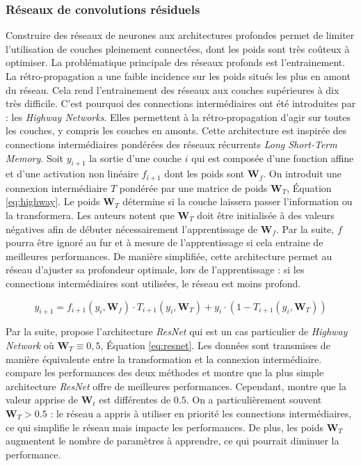 \subsubsection{Réseaux de convolutions résiduels} \label{subsubsec:ResNet}
Construire des réseaux de neurones aux architectures profondes permet de limiter l'utilisation de couches pleinement connectées, dont les poids sont très coûteux à optimiser.
La problématique principale des réseaux profonds est l'entrainement.
La rétro-propagation a une faible incidence sur les poids situés les plus en amont du réseau.
Cela rend l'entrainement des réseaux aux couches supérieures à dix très difficile.
C'est pourquoi des connections intermédiaires ont été introduites par \cite{srivastava_highway_2015, srivastava_training_2015} : les \textit{Highway Networks}.
Elles permettent à la rétro-propagation d'agir sur toutes les couches, y compris les couches en amonts.
Cette architecture est inspirée des connections intermédiaires pondérées des réseaux récurrents \textit{Long Short-Term Memory}.
Soit $y_{i+1}$ la sortie d'une couche $i$ qui est composée d'une fonction affine et d'une activation non linéaire $f_{i+1}$ dont les poids sont $\mathbf{W}_f$.
On introduit une connexion intermédiaire $T$ pondérée par une matrice de poids $\mathbf{W}_T$, Équation \ref{eq:highway}.
Le poids $\mathbf{W}_T$ détermine si la couche laissera passer l'information ou la transformera.
Les auteurs notent que $\mathbf{W}_T$ doit être initialisée à des valeurs négatives afin de débuter nécessairement l'apprentissage de $\mathbf{W}_f$.
Par la suite, $f$ pourra être ignoré au fur et à mesure de l'apprentissage si cela entraine de meilleures performances.
De manière simplifiée, cette architecture permet au réseau d'ajuster sa profondeur optimale, lors de l'apprentissage : si les connections intermédiaires sont utilisées, le réseau est moins profond.

\begin{equation} \label{eq:highway}
y_{i+1} = f_{i+1}\left(y_{i}, \mathbf{W}_f\right) \cdot T_{i+1}\left(y_{i}, \mathbf{W}_{T}\right)+y_{i} \cdot \left(1- T_{i+1}\left(y_{i}, \mathbf{W}_{T}\right)\right)
\end{equation}

Par la suite, \cite{he_deep_2015} propose l'architecture \textit{ResNet} qui est un cas particulier de \textit{Highway Network} où $\mathbf{W}_T \equiv 0,5$, Équation \ref{eq:resnet}.
Les données sont transmises de manière équivalente entre la transformation et la connexion intermédiaire.
\cite{he_identity_2016} compare les performances des deux méthodes et montre que la plus simple architecture \textit{ResNet} offre de meilleures performances.
Cependant, \cite{srivastava_highway_2015} montre que la valeur apprise de $\mathbf{W}_t$ est différentes de $0.5$.
On a particulièrement souvent $\mathbf{W}_T > 0.5$ : le réseau a appris à utiliser en priorité les connections intermédiaires, ce qui simplifie le réseau mais impacte les performances.
De plus, les poids $\mathbf{W}_T$ augmentent le nombre de paramètres à apprendre, ce qui pourrait diminuer la performance.

